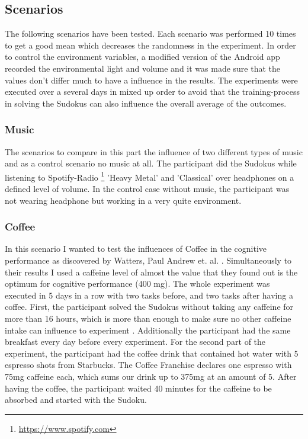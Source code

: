 {\subsection{Scenarios}
The following scenarios have been tested. Each scenario was performed 10 times to get a good mean which decreases the randomness in the experiment. In order to control the environment variables, a modified version of the Android app recorded the environmental light and volume and it was made sure that the values don't differ much to have a influence in the results. 
The experiments were executed over a several days in mixed up order to avoid that the training-process in solving the Sudokus can also influence the overall average of the outcomes.

\subsubsection{Music}
The scenarios to compare in this part the influence of two different types of music and as a control scenario no music at all. The participant did the Sudokus while listening to Spotify-Radio \footnote{\url{https://www.spotify.com}} 'Heavy Metal' and 'Classical' over headphones on a defined level of volume. In the control case without music, the participant was not wearing headphone but working in a very quite environment.

\subsubsection{Coffee}
In this scenario I wanted to test the influences of Coffee in the cognitive performance as discovered by Watters, Paul Andrew et. al. \cite{watters1997caffeine}. Simultaneously to their results I used a caffeine level of almost the value that they found out is the optimum for cognitive performance (400 mg). 
The whole experiment was executed in 5 days in a row with two tasks before, and two tasks after having a coffee. 
First, the participant solved the Sudokus without taking any caffeine for more than 16 hours, which is more than enough to make sure no other caffeine intake can influence to experiment \cite{liguori1997absorption}. Additionally the participant had the same breakfast every day before every experiment. 
For the second part of the experiment, the participant had the coffee drink that contained hot water with 5 espresso shots from Starbucks. The Coffee Franchise declares one espresso with 75mg caffeine each, which sums our drink up to 375mg at an amount of 5. After having the coffee, the participant waited 40 minutes for the caffeine to be absorbed \cite{liguori1997absorption} and started with the Sudoku. 

}

